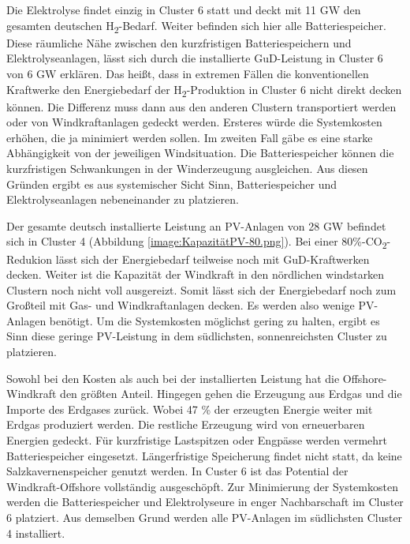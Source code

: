 Die Elektrolyse findet einzig in Cluster 6 statt und deckt mit 11 GW den gesamten deutschen H\textsubscript{2}-Bedarf. Weiter befinden sich hier alle Batteriespeicher. Diese räumliche Nähe zwischen den kurzfristigen Batteriespeichern und Elektrolyseanlagen, lässt sich durch die installierte GuD-Leistung in Cluster 6 von 6 GW erklären. Das heißt, dass in extremen Fällen die konventionellen Kraftwerke den Energiebedarf der H\textsubscript{2}-Produktion in Cluster 6 nicht direkt decken können. Die Differenz muss dann aus den anderen Clustern transportiert werden oder von Windkraftanlagen gedeckt werden. Ersteres würde die Systemkosten erhöhen, die ja minimiert werden sollen. Im zweiten Fall gäbe es eine starke Abhängigkeit von der jeweiligen Windsituation. Die Batteriespeicher können die kurzfristigen Schwankungen in der Winderzeugung ausgleichen. Aus diesen Gründen ergibt es aus systemischer Sicht Sinn, Batteriespeicher und Elektrolyseanlagen nebeneinander zu platzieren. 


Der gesamte deutsch installierte Leistung an PV-Anlagen von 28 GW befindet sich in Cluster 4 (Abbildung \ref{image:KapazitätPV-80.png}). Bei einer 80\%-CO\textsubscript{2}-Redukion lässt sich der Energiebedarf teilweise noch mit GuD-Kraftwerken decken. Weiter ist die Kapazität der Windkraft in den nördlichen windstarken Clustern noch nicht voll ausgereizt. Somit lässt sich der Energiebedarf noch zum Großteil mit Gas- und Windkraftanlagen decken. Es werden also wenige PV-Anlagen benötigt. Um die Systemkosten möglichst gering zu halten, ergibt es Sinn diese geringe PV-Leistung in dem südlichsten, sonnenreichsten Cluster zu platzieren. 

Sowohl bei den Kosten als auch bei der installierten Leistung hat die Offshore-Windkraft den größten Anteil. Hingegen gehen die Erzeugung aus Erdgas und die Importe des Erdgases zurück. Wobei 47 \% der erzeugten Energie weiter mit Erdgas produziert werden. Die restliche Erzeugung wird von erneuerbaren Energien gedeckt. Für kurzfristige Lastspitzen oder Engpässe werden vermehrt Batteriespeicher eingesetzt. Längerfristige Speicherung findet nicht statt, da keine Salzkavernenspeicher genutzt werden. In Custer 6 ist das Potential der Windkraft-Offshore vollständig ausgeschöpft. Zur Minimierung der Systemkosten werden die Batteriespeicher und Elektrolyseure in enger Nachbarschaft im Cluster 6 platziert. Aus demselben Grund werden alle PV-Anlagen im südlichsten Cluster 4 installiert.

